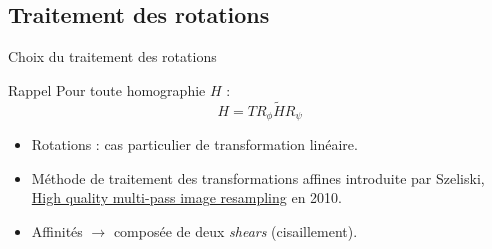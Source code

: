 \documentclass[c,12pt]{beamer}
\newcommand{\ra}[0]{\rightarrow}
\newcommand{\blo}[2]{\begin{block}{#1} #2 \end{block}}
\begin{document}
\subsection{Traitement des rotations}

\begin{frame}{Choix du traitement des rotations}

\blo{Rappel}{Pour toute homographie $H$ : \[H = T R_\phi \tilde H R_\psi\]}
\begin{itemize}
\item Rotations : cas particulier de transformation linéaire. 
\item Méthode de traitement des transformations affines introduite par Szeliski, \underline{High quality multi-pass image resampling} en 2010.
\item Affinités $\ra$ composée de deux \emph{shears} (cisaillement).
\end{itemize}
\end{frame}
\end{document}
